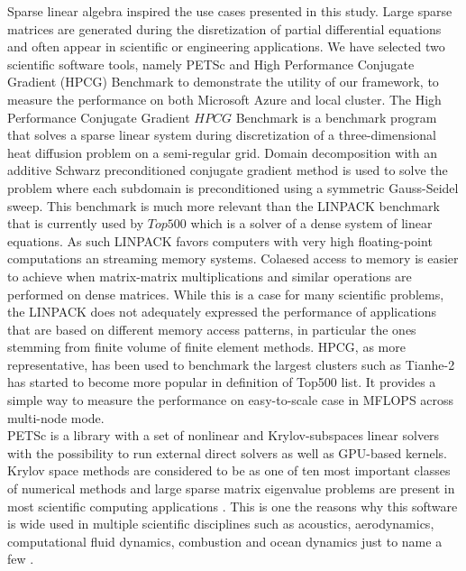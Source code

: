 \documentclass[3p,times]{elsarticle}
\begin{document}
Sparse linear algebra inspired the use cases presented in this study. Large sparse matrices are generated during the disretization of partial differential equations and often appear in scientific or engineering applications. We have selected two scientific software tools, namely PETSc and High Performance Conjugate Gradient (HPCG) Benchmark to demonstrate the utility of our framework, to measure the performance on both Microsoft Azure and local cluster. 
The High Performance Conjugate Gradient \(HPCG\) Benchmark \cite{Heroux2013} is a benchmark program that solves a sparse linear system during discretization of a three-dimensional heat diffusion problem on a semi-regular grid. Domain decomposition with an additive Schwarz preconditioned conjugate gradient method is used to solve the problem where each subdomain is preconditioned using a symmetric Gauss-Seidel sweep. This benchmark is much more relevant than the LINPACK benchmark that is currently used by $Top500$ which is a solver of a dense system of linear equations. As such LINPACK favors computers with very high floating-point computations an streaming memory systems. Colaesed access to memory is easier to achieve when matrix-matrix multiplications and similar operations are performed on dense matrices. While this is a case for many scientific problems, the LINPACK does not adequately expressed the performance of applications that are based on different memory access patterns, in particular the ones stemming from finite volume of finite element methods. HPCG, as more representative, has been used to benchmark the largest clusters such as Tianhe-2 \cite{Xianyi2014} has started to become more popular in definition of Top500 list. It provides a simple way to measure the performance on easy-to-scale case in MFLOPS across multi-node mode. \\
PETSc is a library with a set of nonlinear and Krylov-subspaces linear solvers with the possibility to run external direct solvers as well as GPU-based kernels. Krylov space methods are considered to be as one of ten most important classes of numerical methods and large sparse matrix eigenvalue problems are present in most scientific computing applications \cite{Gutknecht2005}. This is one the reasons why this software is wide used in multiple scientific disciplines such as acoustics, aerodynamics, computational fluid dynamics, combustion and ocean dynamics just to name a few \cite{petsc-efficient}.\\
\end{document}
